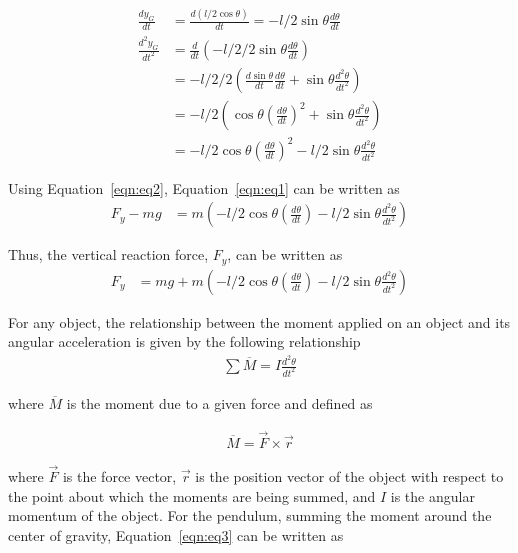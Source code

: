 \documentclass{notes}
\begin{document}
 \begin{align}
   \frac{dy_G}{dt} & = \frac{d(l/2\cos\theta)}{dt} = -l/2\sin\theta\frac{d\theta}{dt} \nonumber\\
   \frac{d^2y_G}{dt^2} & = \frac{d}{dt}\left(-l/2/2 \sin\theta \frac{d\theta}{dt}\right) \nonumber\\
   & = -l/2/2\left(\frac{d\sin\theta}{dt}\frac{d\theta}{dt} + \sin\theta\frac{d^2\theta}{dt^2}\right) \nonumber\\
   & = -l/2\left( \cos\theta \left(\frac{d\theta}{dt}\right)^2 + \sin\theta\frac{d^2\theta}{dt^2}   \right) \nonumber\\
   & = -l/2\cos\theta\left(\frac{d\theta}{dt}\right)^2-l/2\sin\theta\frac{d^2\theta}{dt^2}\label{eqn:eq2}
 \end{align}
 
 Using Equation~\ref{eqn:eq2}, Equation~\ref{eqn:eq1} can be written as 
 \begin{align*}
   F_y - mg & = m\left(-l/2\cos\theta\left(\frac{d\theta}{dt}\right) - l/2\sin\theta\frac{d^2\theta}{dt^2}\right)
 \end{align*}
 
 Thus, the vertical reaction force, $F_y$, can be written as
 \begin{align*}
   F_y & = mg + m\left(-l/2\cos\theta\left(\frac{d\theta}{dt}\right) - l/2\sin\theta\frac{d^2\theta}{dt^2}\right)
 \end{align*}
 
 For any object, the relationship between the moment applied on an object and its angular acceleration is given by the following relationship
 \begin{align}
   \sum \overline{M} = I\frac{d^2\theta}{dt^2}\label{eqn:eq3}
 \end{align}
 
 where $\overline{M}$ is the moment due to a given force and defined as 
 
 \begin{align*}
   \overline{M} = \vec{F} \times \vec{r}
 \end{align*}
 
 where $\vec{F}$ is the force vector, $\vec{r}$ is the position vector of the object with respect to the point about which the moments are being summed, and $I$ is the angular momentum of the object. For the pendulum, summing the moment around the center of gravity, Equation~\ref{eqn:eq3} can be written as
\end{document}
